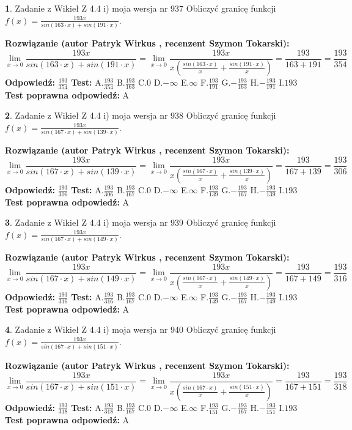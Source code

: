 \documentclass[12pt, a4paper]{article}
\theoremstyle{definition} %
\newtheorem{zad}{}
\newcommand{\zadStart}[1]{\begin{zad}#1\newline}
\newcommand{\zadStop}{\end{zad}}
\newcommand{\rozwStart}[2]{\noindent \textbf{Rozwiązanie (autor #1 , recenzent #2): }\newline}
\newcommand{\rozwStop}{\newline}
\newcommand{\odpStart}{\noindent \textbf{Odpowiedź:}\newline}
\newcommand{\odpStop}{\newline}
\newcommand{\testStart}{\noindent \textbf{Test:}\newline}
\newcommand{\testStop}{\newline}
\newcommand{\kluczStart}{\noindent \textbf{Test poprawna odpowiedź:}\newline}
\newcommand{\kluczStop}{\newline}
\begin{document}
\zadStart{Zadanie z Wikieł Z 4.4 i) moja wersja nr 937}
Obliczyć granicę funkcji $f(x)=\frac{193x}{sin(163\cdot x) +sin(191\cdot x)}$.
\zadStop
\rozwStart{Patryk Wirkus}{Szymon Tokarski}
$$\lim\limits_{x\to 0}\frac{193x}{sin(163\cdot x) +sin(191\cdot x)}=\lim\limits_{x\to 0}\frac{193x}{x(\frac{sin(163\cdot x)}{x}+\frac{sin(191\cdot x)}{x})}=\frac{193}{163+191} = \frac{193}{354}$$
\rozwStop
\odpStart
$\frac{193}{354}$
\odpStop
\testStart
A.$\frac{193}{354}$
B.$\frac{193}{163}$
C.$0$
D.$-\infty$
E.$\infty$
F.$\frac{193}{191}$
G.$-\frac{193}{163}$
H.$-\frac{193}{191}$
I.$193$
\testStop
\kluczStart
A
\kluczStop



\zadStart{Zadanie z Wikieł Z 4.4 i) moja wersja nr 938}
Obliczyć granicę funkcji $f(x)=\frac{193x}{sin(167\cdot x) +sin(139\cdot x)}$.
\zadStop
\rozwStart{Patryk Wirkus}{Szymon Tokarski}
$$\lim\limits_{x\to 0}\frac{193x}{sin(167\cdot x) +sin(139\cdot x)}=\lim\limits_{x\to 0}\frac{193x}{x(\frac{sin(167\cdot x)}{x}+\frac{sin(139\cdot x)}{x})}=\frac{193}{167+139} = \frac{193}{306}$$
\rozwStop
\odpStart
$\frac{193}{306}$
\odpStop
\testStart
A.$\frac{193}{306}$
B.$\frac{193}{167}$
C.$0$
D.$-\infty$
E.$\infty$
F.$\frac{193}{139}$
G.$-\frac{193}{167}$
H.$-\frac{193}{139}$
I.$193$
\testStop
\kluczStart
A
\kluczStop



\zadStart{Zadanie z Wikieł Z 4.4 i) moja wersja nr 939}
Obliczyć granicę funkcji $f(x)=\frac{193x}{sin(167\cdot x) +sin(149\cdot x)}$.
\zadStop
\rozwStart{Patryk Wirkus}{Szymon Tokarski}
$$\lim\limits_{x\to 0}\frac{193x}{sin(167\cdot x) +sin(149\cdot x)}=\lim\limits_{x\to 0}\frac{193x}{x(\frac{sin(167\cdot x)}{x}+\frac{sin(149\cdot x)}{x})}=\frac{193}{167+149} = \frac{193}{316}$$
\rozwStop
\odpStart
$\frac{193}{316}$
\odpStop
\testStart
A.$\frac{193}{316}$
B.$\frac{193}{167}$
C.$0$
D.$-\infty$
E.$\infty$
F.$\frac{193}{149}$
G.$-\frac{193}{167}$
H.$-\frac{193}{149}$
I.$193$
\testStop
\kluczStart
A
\kluczStop



\zadStart{Zadanie z Wikieł Z 4.4 i) moja wersja nr 940}
Obliczyć granicę funkcji $f(x)=\frac{193x}{sin(167\cdot x) +sin(151\cdot x)}$.
\zadStop
\rozwStart{Patryk Wirkus}{Szymon Tokarski}
$$\lim\limits_{x\to 0}\frac{193x}{sin(167\cdot x) +sin(151\cdot x)}=\lim\limits_{x\to 0}\frac{193x}{x(\frac{sin(167\cdot x)}{x}+\frac{sin(151\cdot x)}{x})}=\frac{193}{167+151} = \frac{193}{318}$$
\rozwStop
\odpStart
$\frac{193}{318}$
\odpStop
\testStart
A.$\frac{193}{318}$
B.$\frac{193}{167}$
C.$0$
D.$-\infty$
E.$\infty$
F.$\frac{193}{151}$
G.$-\frac{193}{167}$
H.$-\frac{193}{151}$
I.$193$
\testStop
\kluczStart
A
\kluczStop
\end{document}
